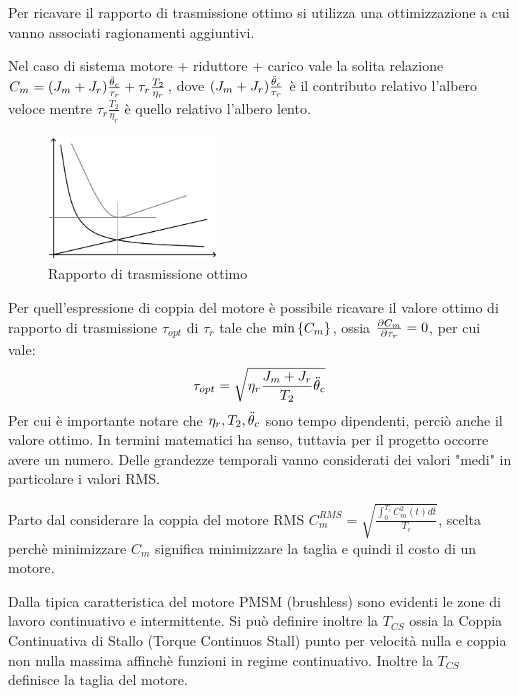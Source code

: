Per ricavare il rapporto di trasmissione ottimo si utilizza una ottimizzazione a cui vanno associati ragionamenti aggiuntivi.

Nel caso di sistema motore + riduttore + carico vale la solita relazione \(C_m = (J_m+J_r)\frac{\Ddot{\theta}_c}{\tau_r} + \tau_r \frac{T_2}{\eta_r}\), dove \((J_m+J_r)\frac{\Ddot{\theta}_c}{\tau_r}\) è il contributo relativo l'albero veloce mentre \(\tau_r \frac{T_2}{\eta_r}\) è quello relativo l'albero lento.

\begin{figure}[h]
    \centering
    \includegraphics[width=0.4\textwidth]{Immagini/CoppiaTauRott.png}
    \caption{Rapporto di trasmissione ottimo}
\end{figure}


Per quell'espressione di coppia del motore è possibile ricavare il valore ottimo di rapporto di trasmissione \(\tau_{opt}\) di \(\tau_r\) tale che \(\operatorname{min}\left\{ C_m \right\}\), ossia \(\frac{\partial C_m}{\partial \tau_r} = 0\), per cui vale:
\[ \tau_{opt} = \sqrt{\eta_r \frac{J_m + J_r}{T_2}\Ddot{\theta}_c} \]
Per cui è importante notare che \(\eta_r, T_2, \Ddot{\theta}_c\) sono tempo dipendenti, perciò anche il valore ottimo. In termini matematici ha senso, tuttavia per il progetto occorre avere un numero.
Delle grandezze temporali vanno considerati dei valori "medi" in particolare i valori RMS.

Parto dal considerare la coppia del motore RMS \(C_m^{RMS} = \sqrt{\frac{\int_0^{T_c} C_m^2(t)dt}{T_c}}\), scelta perchè minimizzare \(C_m\) significa minimizzare la taglia e quindi il costo di un motore.

Dalla tipica caratteristica del motore PMSM (brushless) sono evidenti le zone di lavoro continuativo e intermittente.
Si può definire inoltre la \(T_{CS}\) ossia la Coppia Continuativa di Stallo (Torque Continuos Stall) punto per velocità nulla e coppia non nulla massima affinchè funzioni in regime continuativo. Inoltre la \(T_{CS}\) definisce la taglia del motore.

